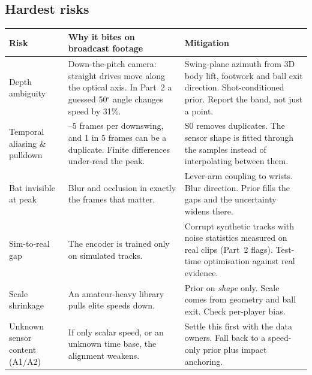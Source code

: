 \documentclass[11pt,a4paper]{article}
\begin{document}
\subsection{Hardest risks}\label{sec:risks}
\begin{table}[H]
\centering\small
\renewcommand{\arraystretch}{1.18}
\begin{tabularx}{\linewidth}{>{\raggedright\arraybackslash}p{3.3cm} >{\raggedright\arraybackslash}X >{\raggedright\arraybackslash}X}
\toprule
\textbf{Risk} & \textbf{Why it bites on broadcast footage} & \textbf{Mitigation} \\
\midrule
Depth ambiguity & Down-the-pitch camera: straight drives move along the optical axis. In Part~2 a guessed 50$^\circ$ angle changes speed by 31\%. & Swing-plane azimuth from 3D body lift, footwork and ball exit direction. Shot-conditioned prior. Report the band, not just a point. \\
Temporal aliasing \& pulldown & 4--5 frames per downswing, and 1 in 5 frames can be a duplicate. Finite differences under-read the peak. & S0 removes duplicates. The sensor shape is fitted through the samples instead of interpolating between them. \\
Bat invisible at peak & Blur and occlusion in exactly the frames that matter. & Lever-arm coupling to wrists. Blur direction. Prior fills the gaps and the uncertainty widens there. \\
Sim-to-real gap & The encoder is trained only on simulated tracks. & Corrupt synthetic tracks with noise statistics measured on real clips (Part~2 flags). Test-time optimisation against real evidence. \\
Scale shrinkage & An amateur-heavy library pulls elite speeds down. & Prior on \emph{shape} only. Scale comes from geometry and ball exit. Check per-player bias. \\
Unknown sensor content (A1/A2) & If only scalar speed, or an unknown time base, the alignment weakens. & Settle this first with the data owners. Fall back to a speed-only prior plus impact anchoring. \\
\bottomrule
\end{tabularx}
\end{table}
\end{document}
